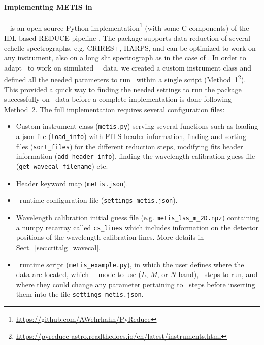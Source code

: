 \paragraph{Implementing METIS in \pyred}\label{sec:pyred_mic}
\pyred~\cite{pis21} is an  open source Python implementation\footnote{\url{https://github.com/AWehrhahn/PyReduce}} (with some C components)  of the IDL-based REDUCE pipeline \cite{pis02}.  The package supports data reduction of several echelle spectrographs, e.g. CRIRES+,  HARPS, and can be optimized to work on any instrument, also on a  long slit spectrograph as in the case of \met. In order to adapt \pyred~to work on simulated \met~\lss~data, we created a custom instrument class  and defined all the needed parameters to run \pyred~within a single script (Method~1\footnote{\url{https://pyreduce-astro.readthedocs.io/en/latest/instruments.html}}). This provided a quick way to finding the needed settings to  run the package successfully on \met~data before a complete implementation is done following Method~2. The full implementation requires several configuration files: 
\begin{itemize}
\item Custom instrument class (\texttt{metis.py}) serving several functions such as loading a json file (\texttt{load\_info}) with FITS header information, finding  and sorting files (\texttt{sort\_files}) for the different reduction steps, modifying fits header information (\texttt{add\_header\_info}), finding the wavelength calibration guess file (\texttt{get\_wavecal\_filename}) etc.
\item Header keyword map (\texttt{metis.json}).
\item \pyred~runtime configuration file (\texttt{settings\_metis.json}). 
\item Wavelength calibration initial guess  file (e.g. \texttt{metis\_lss\_m\_2D.npz}) containing a numpy recarray called \texttt{cs\_lines} which includes information on the detector positions of the wavelength calibration lines.
 More details in Sect.~\ref{sec:critalg_wavecal}.
\item \pyred~runtime script (\texttt{metis\_example.py}), in which the user defines where the data are located, which \met~\lss~mode to use ($L$, $M$, or $N$-band), \pyred~steps to run, and where they could change any parameter pertaining to \pyred~steps before inserting them into the file \texttt{settings\_metis.json}.
\end{itemize}

